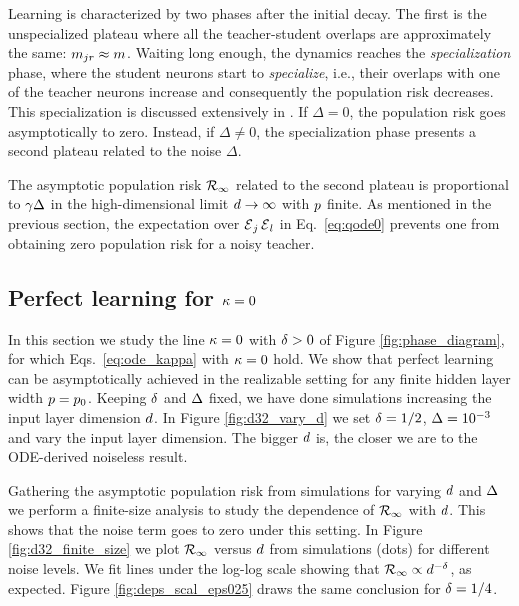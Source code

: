 \documentclass[10pt]{article}
\begin{document}
Learning is characterized by two phases after the initial decay. The first is the unspecialized plateau where all the teacher-student overlaps are approximately the same: $m_{jr} \approx m $. Waiting long enough, the dynamics reaches the {\it specialization} phase, where the student neurons start to {\it specialize}, i.e., their overlaps with one of the teacher neurons increase and consequently the population risk decreases. This specialization is discussed extensively in \cite{saad_1995}. If $\Delta = 0$, the population risk goes asymptotically to zero. Instead, if $\Delta \ne 0$, the specialization phase presents a second plateau related to the noise $\Delta$.

    The asymptotic population risk ${\cal R}_\infty$ related to the second plateau is proportional to $ \gamma \Delta$ \cite{goldt_2019} in the high-dimensional limit $d \to\infty$ with $p$ finite. As mentioned in the previous section, the expectation over  $\operatorname{{\cal E}}_j \operatorname{{\cal E}}_l$ in Eq.~\eqref{eq:qode0} prevents one from obtaining zero population risk for a noisy teacher. 

\subsection{Perfect learning for \texorpdfstring{$\kappa = 0$}{K=0}}
In this section we study the line $\kappa = 0$ with $\delta >0 $ of Figure \ref{fig:phase_diagram}, for which Eqs.~\eqref{eq:ode_kappa} with $\kappa=0$ hold. We show that perfect learning can be asymptotically achieved in the realizable setting for any finite hidden layer width $p = p_0$. Keeping $\delta$ and $\Delta$ fixed, we have done simulations increasing the input layer dimension $d$. In Figure \ref{fig:d32_vary_d} we set $\delta = 1/2$, $\Delta = 10^{-3}$ and vary the input layer dimension. The bigger $d$ is, the closer we are to the ODE-derived noiseless result.


Gathering the asymptotic population risk from simulations for varying $d$ and $\Delta$ we perform a finite-size analysis to study the  dependence of $ {\cal R}_\infty$ with $d$. This shows that the noise term goes to zero under this setting. In Figure \ref{fig:d32_finite_size} we plot ${\cal R}_\infty$ versus $d$ from simulations (dots) for different noise levels. We fit lines under the log-log scale showing that $ {\cal R}_\infty \propto d^{-\delta}$, as expected. Figure \ref{fig:deps_scal_eps025} draws the same conclusion for $\delta=1/4$.
\end{document}
